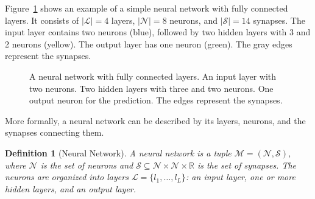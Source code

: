 \documentclass[
12pt,
fancyheadings,
a4paper,
twoside,
BCOR=0.7cm,
nobcorignoretitle,
grayscalebody,
]{stsreprt}
\newtheorem{definition}{Definition}[chapter]
\begin{document}
Figure~\ref{fig:neural_network} shows an example of a simple neural network with fully connected
layers. It consists of $|\mathcal{L}| = 4$ layers, $|\mathcal{N}| = 8$ neurons, and $|\mathcal{S}|
= 14$ synapses. The input layer contains two neurons (blue), followed by two hidden layers with 3
and 2 neurons (yellow). The output layer has one neuron (green). The gray edges represent the
synapses.
\begin{figure}[ht]
    \centering
    \caption{A neural network with fully connected layers. An input layer with two neurons. Two hidden layers with three and two neurons. One output neuron for the prediction. The edges represent the synapses.}
    \label{fig:neural_network}
\end{figure}

More formally, a neural network can be described by its layers, neurons, and the synapses
connecting them.

\begin{definition}[Neural Network]
\label{def:neural_network}
A neural network is a tuple $\mathcal{M} = (\mathcal{N}, \mathcal{S})$, where $\mathcal{N}$ is the
set of neurons and $\mathcal{S} \subseteq \mathcal{N} \times \mathcal{N} \times \mathbb{R}$ is the
set of synapses.
The neurons are organized into layers $\mathcal{L} = \{l_1, \dots, l_L\}$: an input layer, one or
more hidden layers, and an output layer.
\end{definition}
\end{document}
